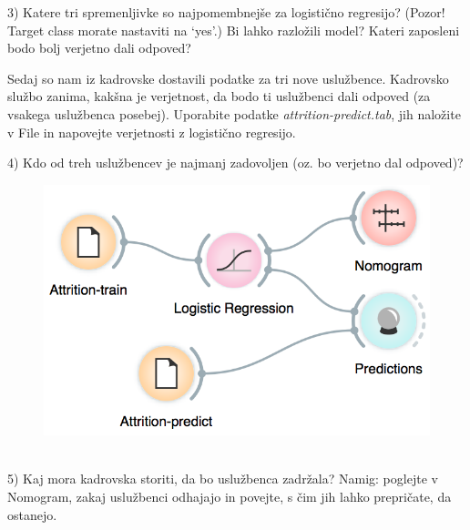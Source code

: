 3) Katere tri spremenljivke so najpomembnejše za logistično regresijo? (Pozor! Target class morate nastaviti na ‘yes’.) Bi lahko razložili model? Kateri zaposleni bodo bolj verjetno dali odpoved?

\hspace{1cm}

Sedaj so nam iz kadrovske dostavili podatke za tri nove uslužbence. Kadrovsko službo zanima, kakšna je verjetnost, da bodo ti uslužbenci dali odpoved (za vsakega uslužbenca posebej). Uporabite podatke \textit{attrition-predict.tab}, jih naložite v File in napovejte verjetnosti z logistično regresijo.

4) Kdo od treh uslužbencev je najmanj zadovoljen (oz. bo verjetno dal odpoved)?

\begin{figure}
    \includegraphics[scale=0.7]{workflow2.png}
    \caption{$\;$}
\end{figure}

5) Kaj mora kadrovska storiti, da bo uslužbenca zadržala? Namig: poglejte v Nomogram, zakaj uslužbenci odhajajo in povejte, s čim jih lahko prepričate, da ostanejo.